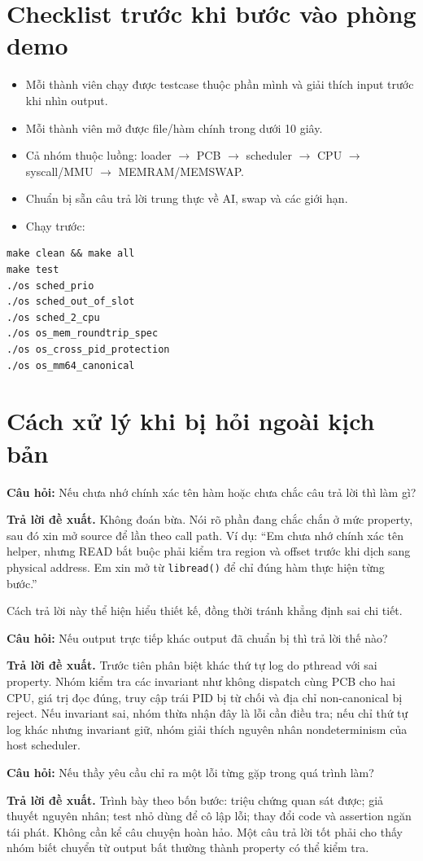 \documentclass[11pt,a4paper]{article}
\newcommand{\code}[1]{\texttt{\color{navy}#1}}
\newcommand{\q}[1]{%
  \vspace{0.55em}\noindent
  \colorbox{pale}{\parbox{\dimexpr\textwidth-2\fboxsep}{\textbf{\color{navy}Câu hỏi:} #1}}%
  \par\vspace{0.3em}}
\newcommand{\ans}[1]{\textbf{\color{cyan}Trả lời đề xuất.} #1\par}
\begin{document}
\section{Checklist trước khi bước vào phòng demo}

\begin{itemize}
  \item Mỗi thành viên chạy được testcase thuộc phần mình và giải thích input trước khi nhìn output.
  \item Mỗi thành viên mở được file/hàm chính trong dưới 10 giây.
  \item Cả nhóm thuộc luồng: loader $\rightarrow$ PCB $\rightarrow$ scheduler
  $\rightarrow$ CPU $\rightarrow$ syscall/MMU $\rightarrow$ MEMRAM/MEMSWAP.
  \item Chuẩn bị sẵn câu trả lời trung thực về AI, swap và các giới hạn.
  \item Chạy trước:
\end{itemize}

\begin{lstlisting}
make clean && make all
make test
./os sched_prio
./os sched_out_of_slot
./os sched_2_cpu
./os os_mem_roundtrip_spec
./os os_cross_pid_protection
./os os_mm64_canonical
\end{lstlisting}

\section{Cách xử lý khi bị hỏi ngoài kịch bản}

\q{Nếu chưa nhớ chính xác tên hàm hoặc chưa chắc câu trả lời thì làm gì?}
\ans{Không đoán bừa. Nói rõ phần đang chắc chắn ở mức property, sau đó xin mở
source để lần theo call path. Ví dụ: ``Em chưa nhớ chính xác tên helper, nhưng
READ bắt buộc phải kiểm tra region và offset trước khi dịch sang physical
address. Em xin mở từ \code{libread()} để chỉ đúng hàm thực hiện từng bước.''}
Cách trả lời này thể hiện hiểu thiết kế, đồng thời tránh khẳng định sai chi tiết.

\q{Nếu output trực tiếp khác output đã chuẩn bị thì trả lời thế nào?}
\ans{Trước tiên phân biệt khác thứ tự log do pthread với sai property. Nhóm kiểm
tra các invariant như không dispatch cùng PCB cho hai CPU, giá trị đọc đúng,
truy cập trái PID bị từ chối và địa chỉ non-canonical bị reject. Nếu invariant
sai, nhóm thừa nhận đây là lỗi cần điều tra; nếu chỉ thứ tự log khác nhưng
invariant giữ, nhóm giải thích nguyên nhân nondeterminism của host scheduler.}

\q{Nếu thầy yêu cầu chỉ ra một lỗi từng gặp trong quá trình làm?}
\ans{Trình bày theo bốn bước: triệu chứng quan sát được; giả thuyết nguyên nhân;
test nhỏ dùng để cô lập lỗi; thay đổi code và assertion ngăn tái phát. Không cần
kể câu chuyện hoàn hảo. Một câu trả lời tốt phải cho thấy nhóm biết chuyển từ
output bất thường thành property có thể kiểm tra.}
\end{document}
